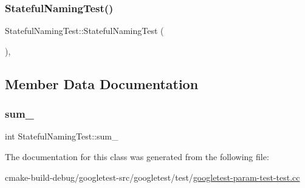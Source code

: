 \subsubsection{\texorpdfstring{StatefulNamingTest()}{StatefulNamingTest()}}
{\footnotesize\ttfamily Stateful\+Naming\+Test\+::\+Stateful\+Naming\+Test (\begin{DoxyParamCaption}{ }\end{DoxyParamCaption})\hspace{0.3cm}{\ttfamily [inline]}, {\ttfamily [protected]}}



\subsection{Member Data Documentation}
\mbox{\label{classStatefulNamingTest_ad719a1c2919c304bfe840313142a376a}} 
\subsubsection{\texorpdfstring{sum\_}{sum\_}}
{\footnotesize\ttfamily int Stateful\+Naming\+Test\+::sum\+\_\+\hspace{0.3cm}{\ttfamily [protected]}}



The documentation for this class was generated from the following file\+:\begin{DoxyCompactItemize}
\item 
cmake-\/build-\/debug/googletest-\/src/googletest/test/\mbox{\hyperlink{googletest-param-test-test_8cc}{googletest-\/param-\/test-\/test.\+cc}}\end{DoxyCompactItemize}
